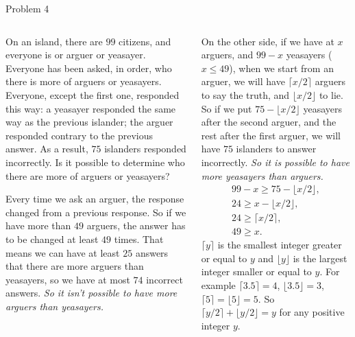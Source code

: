 \documentclass[9pt,aspectratio=169]{beamer}
\begin{document}
\begin{frame}{Problem 4}
  \begin{columns}[T]
    \begin{column}{0.5\textwidth}
      \begin{problem}
        On an island, there are $99$ citizens, and everyone is or arguer or yeasayer. Everyone has been asked, in order, who there is more of arguers or yeasayers. Everyone, except the first one, responded this way: a yeasayer responded the same way as the previous islander; the arguer responded contrary to the previous answer. As a result, $75$ islanders responded incorrectly. Is it possible to determine who there are more of arguers or yeasayers?
      \end{problem}
      Every time we ask an arguer, the response changed from a previous response. So if we have more than $49$ arguers, the answer has to be changed at least $49$ times. That means we can have at least $25$ answers that there are more arguers than yeasayers, so we have at most $74$ incorrect answers. \emph{So it isn't possible to have more arguers than yeasayers.}
      
    \end{column}
    \begin{column}{0.5\textwidth}
      On the other side, if we have at $x$ arguers, and $99-x$ yeasayers ($x \leq 49$), when we start from an arguer, we will have $\lceil x/2 \rceil$ arguers to say the truth, and $\lfloor x/2 \rfloor$ to lie. So if we put $75 - \lfloor x/2 \rfloor$ yeasayers after the second arguer, and the rest after the first arguer, we will have $75$ islanders to answer incorrectly. \emph{So it is possible to have more yeasayers than arguers.}
      \begin{gather*}
        99 - x \geq 75 - \lfloor x/2 \rfloor,\\
        24 \geq x - \lfloor x/2 \rfloor,\\
        24 \geq \lceil x/2 \rceil,\\
        49 \geq x.    
      \end{gather*}
      $\lceil y \rceil$ is the smallest integer greater or equal to $y$ and $\lfloor y \rfloor$ is the largest integer smaller or equal to $y$. For example $\lceil 3.5 \rceil = 4$, $\lfloor 3.5 \rfloor = 3$, $\lceil 5 \rceil = \lfloor 5 \rfloor = 5$. So $\lceil y/2 \rceil + \lfloor y/2 \rfloor = y$ for any positive integer $y$.
    \end{column}
  \end{columns}
\end{frame}
\end{document}
